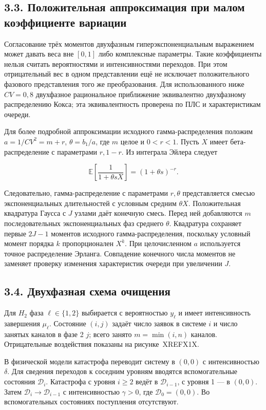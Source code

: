 \subsection*{3.3. Положительная аппроксимация при малом коэффициенте вариации}
Согласование трёх моментов двухфазным гиперэкспоненциальным выражением может давать веса вне \([0,1]\) либо комплексные параметры. Такие коэффициенты нельзя считать вероятностями и интенсивностями переходов. При этом отрицательный вес в одном представлении ещё не исключает положительного фазового представления того же преобразования. Для использованного ниже \(CV=0{,}8\) двухфазное рациональное приближение эквивалентно двухфазному распределению Кокса; эта эквивалентность проверена по ПЛС и характеристикам очереди.

Для более подробной аппроксимации исходного гамма-распределения положим \(a=1/CV^2=m+r\), \(\theta=b_1/a\), где \(m\) целое и \(0<r<1\). Пусть \(X\) имеет бета-распределение с параметрами \(r,1-r\). Из интеграла Эйлера \cite{nistdlmf} следует


\[\mathbb E\!\left[\frac{1}{1+\theta sX}\right]=(1+\theta s)^{-r}.\]


Следовательно, гамма-распределение с параметрами \(r,\theta\) представляется смесью экспоненциальных длительностей с условным средним \(\theta X\). Положительная квадратура Гаусса с \(J\) узлами даёт конечную смесь. Перед ней добавляются \(m\) последовательных экспоненциальных фаз среднего \(\theta\). Квадратура сохраняет первые \(2J-1\) моментов исходного гамма-распределения, поскольку условный момент порядка \(k\) пропорционален \(X^k\). При целочисленном \(a\) используется точное распределение Эрланга. Совпадение конечного числа моментов не заменяет проверку изменения характеристик очереди при увеличении \(J\).

\subsection*{3.4. Двухфазная схема очищения}
Для \(H_2\) фаза \(\ell\in\{1,2\}\) выбирается с вероятностью \(y_\ell\) и имеет интенсивность завершения \(\mu_\ell\). Состояние \((i,j)\) задаёт число заявок в системе \(i\) и число занятых каналов в фазе 2 \(j\); всего занято \(m=\min(i,n)\) каналов. Отрицательные воздействия показаны на рисунке~XREFX1X.

В физической модели катастрофа переводит систему в \((0,0)\) с интенсивностью \(\delta\). Для сведения переходов к соседним уровням вводятся вспомогательные состояния \(\mathcal D_i\). Катастрофа с уровня \(i\ge2\) ведёт в \(\mathcal D_{i-1}\), с уровня 1 --- в \((0,0)\). Затем \(\mathcal D_i\to\mathcal D_{i-1}\) с интенсивностью \(\gamma>0\), где \(\mathcal D_0=(0,0)\). Во вспомогательных состояниях поступления отсутствуют.


